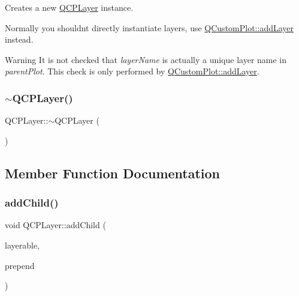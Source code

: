 Creates a new \hyperlink{class_q_c_p_layer}{Q\+C\+P\+Layer} instance.

Normally you shouldn\textquotesingle{}t directly instantiate layers, use \hyperlink{class_q_custom_plot_ad5255393df078448bb6ac83fa5db5f52}{Q\+Custom\+Plot\+::add\+Layer} instead.

\begin{DoxyWarning}{Warning}
It is not checked that {\itshape layer\+Name} is actually a unique layer name in {\itshape parent\+Plot}. This check is only performed by \hyperlink{class_q_custom_plot_ad5255393df078448bb6ac83fa5db5f52}{Q\+Custom\+Plot\+::add\+Layer}. 
\end{DoxyWarning}
\mbox{\label{class_q_c_p_layer_afc1a8940f8e34c9f25ead9dfd4828cae}} 
\subsubsection{\texorpdfstring{$\sim$\+Q\+C\+P\+Layer()}{~QCPLayer()}}
{\footnotesize\ttfamily Q\+C\+P\+Layer\+::$\sim$\+Q\+C\+P\+Layer (\begin{DoxyParamCaption}{ }\end{DoxyParamCaption})\hspace{0.3cm}{\ttfamily [virtual]}}



\subsection{Member Function Documentation}
\mbox{\label{class_q_c_p_layer_a57ce5e49364aa9122276d5df3b4a0ddc}} 
\subsubsection{\texorpdfstring{add\+Child()}{addChild()}}
{\footnotesize\ttfamily void Q\+C\+P\+Layer\+::add\+Child (\begin{DoxyParamCaption}\item[{\hyperlink{class_q_c_p_layerable}{Q\+C\+P\+Layerable} $\ast$}]{layerable,  }\item[{bool}]{prepend }\end{DoxyParamCaption})\hspace{0.3cm}{\ttfamily [protected]}}


